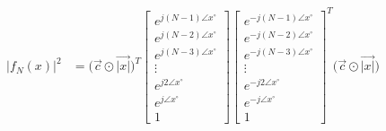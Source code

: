 \documentclass{article}
\begin{document}
\begin{align*}
     \Big|f_{N}(x)\Big|^{2}&= \Big(\vec{c} \odot \vec{|x|}\Big)^{T}\begin{bmatrix}
                                                                        e^{j(N - 1)\angle{x}^{\circ}} \\
                                                                        e^{j(N - 2)\angle{x}^{\circ}} \\
                                                                        e^{j(N - 3)\angle{x}^{\circ}} \\
                                                                        \vdots \\
                                                                        e^{j2\angle{x}^{\circ}} \\
                                                                        e^{j\angle{x}^{\circ}} \\
                                                                        1
                                                                    \end{bmatrix}
                                                                  \begin{bmatrix}
                                                                        e^{-j(N - 1)\angle{x}^{\circ}} \\
                                                                        e^{-j(N - 2)\angle{x}^{\circ}} \\
                                                                        e^{-j(N - 3)\angle{x}^{\circ}} \\
                                                                        \vdots \\
                                                                        e^{-j2\angle{x}^{\circ}} \\
                                                                        e^{-j\angle{x}^{\circ}} \\
                                                                        1
                                                                    \end{bmatrix}^{T}\Big(\vec{c} \odot \vec{|x|}\Big)   
\end{align*}
\end{document}
